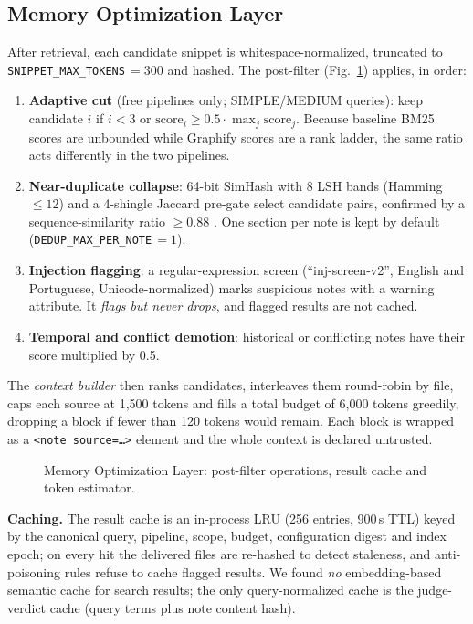 \documentclass[conference,onecolumn,11pt]{IEEEtran}
\begin{document}
\subsection{Memory Optimization Layer}\label{sec:opt}
After retrieval, each candidate snippet is whitespace-normalized, truncated to \texttt{SNIPPET\_MAX\_TOKENS}\,$=300$ and hashed. The post-filter (Fig.~\ref{fig:opt}) applies, in order:
\begin{enumerate}
\item \textbf{Adaptive cut} (free pipelines only; SIMPLE/MEDIUM queries): keep candidate $i$ if $i<3$ or $\mathrm{score}_i\ge 0.5\cdot\max_j \mathrm{score}_j$. Because baseline BM25 scores are unbounded while Graphify scores are a rank ladder, the same ratio acts differently in the two pipelines.
\item \textbf{Near-duplicate collapse}: 64-bit SimHash with 8 LSH bands (Hamming $\le12$) and a 4-shingle Jaccard pre-gate select candidate pairs, confirmed by a sequence-similarity ratio $\ge 0.88$ \cite{charikar2002simhash,manku2007nearduplicates,broder1997resemblance}. One section per note is kept by default (\texttt{DEDUP\_MAX\_PER\_NOTE}\,$=1$).
\item \textbf{Injection flagging}: a regular-expression screen (``inj-screen-v2'', English and Portuguese, Unicode-normalized) marks suspicious notes with a warning attribute. It \emph{flags but never drops}, and flagged results are not cached.
\item \textbf{Temporal and conflict demotion}: historical or conflicting notes have their score multiplied by 0.5.
\end{enumerate}
The \emph{context builder} then ranks candidates, interleaves them round-robin by file, caps each source at 1,500 tokens and fills a total budget of 6,000 tokens greedily, dropping a block if fewer than 120 tokens would remain. Each block is wrapped as a \texttt{<note source=\dots>} element and the whole context is declared untrusted.

\begin{figure}[!htbp]\centering
{}
\caption{Memory Optimization Layer: post-filter operations, result cache and token estimator.}\label{fig:opt}
\end{figure}

\textbf{Caching.} The result cache is an in-process LRU (256 entries, 900\,s TTL) keyed by the canonical query, pipeline, scope, budget, configuration digest and index epoch; on every hit the delivered files are re-hashed to detect staleness, and anti-poisoning rules refuse to cache flagged results. We found \emph{no} embedding-based semantic cache for search results; the only query-normalized cache is the judge-verdict cache (query terms plus note content hash).
\end{document}
